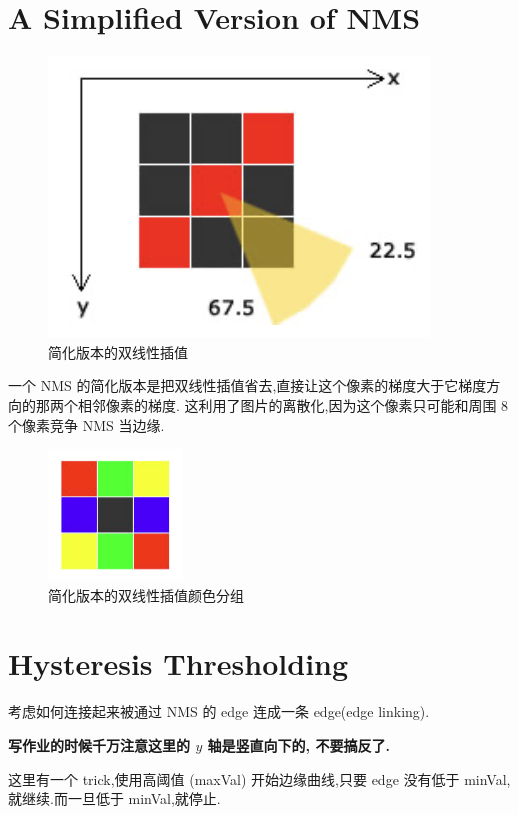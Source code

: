 \section{A Simplified Version of NMS}

\begin{figure}[htbp]
    \centering
	\includegraphics[scale=0.55]{figures/simple_NMS.png}
	\caption{简化版本的双线性插值}
\end{figure}

一个 NMS 的简化版本是把双线性插值省去,直接让这个像素的梯度大于它梯度方向的那两个相邻像素的梯度. 这利用了图片的离散化,因为这个像素只可能和周围 8 个像素竞争 NMS 当边缘.

\begin{figure}[htbp]
    \centering
	\includegraphics[scale=0.55]{figures/simple_NMS_2.png}
	\caption{简化版本的双线性插值颜色分组}
\end{figure}

\section{Hysteresis Thresholding}

考虑如何连接起来被通过 NMS 的 edge 连成一条 edge(edge linking).

\textbf{写作业的时候千万注意这里的 $y$ 轴是竖直向下的, 不要搞反了.}

这里有一个 trick,使用高阈值 (maxVal) 开始边缘曲线,只要 edge 没有低于 minVal,就继续.而一旦低于 minVal,就停止.

